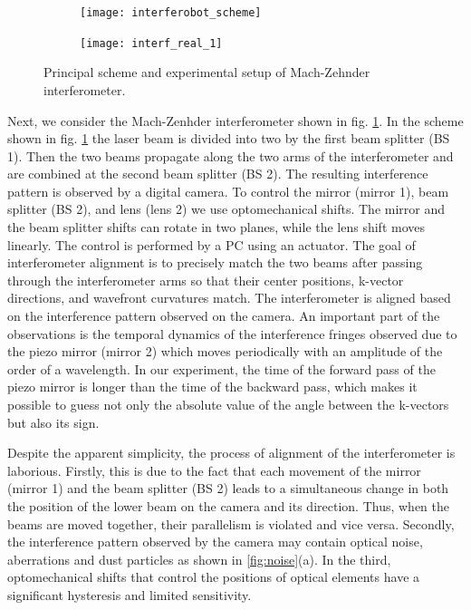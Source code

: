 \begin{figure}[ht]
    \centering
     \begin{subfigure}[b]{0.45\linewidth}
         \centering
         \texttt{[image: interferobot\_scheme]}
     \end{subfigure}
     \centering
     \begin{subfigure}[b]{0.45\linewidth}
         \centering
         \texttt{[image: interf\_real\_1]}
     \end{subfigure}
    \caption{
     Principal scheme and experimental setup of Mach-Zehnder interferometer.}
\label{fig:interf_scheme_1}
\end{figure}

Next, we consider the Mach-Zenhder interferometer shown in fig. \ref{fig:interf_scheme_1}. In the scheme shown in fig. \ref{fig:interf_scheme_1} the laser beam is divided into two by the first beam splitter (BS 1). Then the two beams propagate along the two arms of the interferometer and are combined at the second beam splitter (BS 2). The resulting interference pattern is observed by a digital camera. To control the mirror (mirror 1), beam splitter (BS 2), and lens (lens 2) we use optomechanical shifts. The mirror and the beam splitter shifts can rotate in two planes, while the lens shift moves linearly. The control is performed by a PC using an actuator. The goal of interferometer alignment is to precisely match the two beams after passing through the interferometer arms so that their center positions, k-vector directions, and wavefront curvatures match. The interferometer is aligned based on the interference pattern observed on the camera. An important part of the observations is the temporal dynamics of the interference fringes observed due to the piezo mirror (mirror 2) which moves periodically with an amplitude of the order of a wavelength. In our experiment, the time of the forward pass of the piezo mirror is longer than the time of the backward pass, which makes it possible to guess not only the absolute value of the angle between the k-vectors but also its sign.

Despite the apparent simplicity, the process of alignment of the interferometer is laborious. Firstly, this is due to the fact that each movement of the mirror (mirror 1) and the beam splitter (BS 2) leads to a simultaneous change in both the position of the lower beam on the camera and its direction. Thus, when the beams are moved together, their parallelism is violated and vice versa. Secondly, the interference pattern observed by the camera may contain optical noise, aberrations and dust particles as shown in \ref{fig:noise}(a). In the third, optomechanical shifts that control the positions of optical elements have a significant hysteresis and limited sensitivity.


